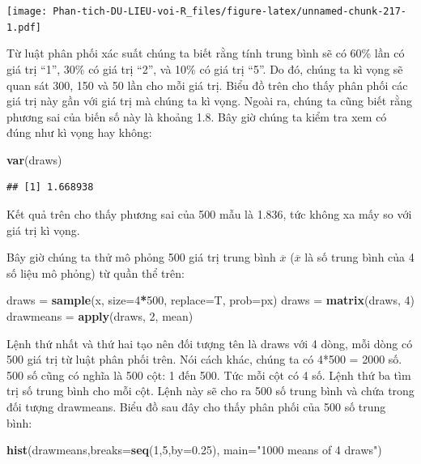 \documentclass[
]{book}
\newenvironment{Shaded}{\begin{snugshade}}{\end{snugshade}}
\newcommand{\DataTypeTok}[1]{\textcolor[rgb]{0.13,0.29,0.53}{#1}}
\newcommand{\DecValTok}[1]{\textcolor[rgb]{0.00,0.00,0.81}{#1}}
\newcommand{\FloatTok}[1]{\textcolor[rgb]{0.00,0.00,0.81}{#1}}
\newcommand{\KeywordTok}[1]{\textcolor[rgb]{0.13,0.29,0.53}{\textbf{#1}}}
\newcommand{\NormalTok}[1]{#1}
\newcommand{\OperatorTok}[1]{\textcolor[rgb]{0.81,0.36,0.00}{\textbf{#1}}}
\newcommand{\StringTok}[1]{\textcolor[rgb]{0.31,0.60,0.02}{#1}}
\begin{document}
\texttt{[image: Phan-tich-DU-LIEU-voi-R\_files/figure-latex/unnamed-chunk-217-1.pdf]}

Từ luật phân phối xác suất chúng ta biết rằng tính trung bình sẽ có 60\% lần có giá trị ``1'', 30\% có giá trị ``2'', và 10\% có giá trị ``5''. Do đó, chúng ta kì vọng sẽ quan sát 300, 150 và 50 lần cho mỗi giá trị. Biểu đồ trên cho thấy phân phối các giá trị này gần với giá trị mà chúng ta kì vọng. Ngoài ra, chúng ta cũng biết rằng phương sai của biến số này là khoảng 1.8. Bây giờ chúng ta kiểm tra xem có đúng như kì vọng hay không:

\begin{Shaded}
\begin{Highlighting}[]
\KeywordTok{var}\NormalTok{(draws)}
\end{Highlighting}
\end{Shaded}

\begin{verbatim}
## [1] 1.668938
\end{verbatim}

Kết quả trên cho thấy phương sai của 500 mẫu là 1.836, tức không xa mấy so với giá trị kì vọng.

Bây giờ chúng ta thử mô phỏng 500 giá trị trung bình \(\overline{x}\) (\(\overline{x}\) là số trung bình của 4 số liệu mô phỏng) từ quần thể trên:

\begin{Shaded}
\begin{Highlighting}[]
\NormalTok{draws =}\StringTok{ }\KeywordTok{sample}\NormalTok{(x, }\DataTypeTok{size=}\DecValTok{4}\OperatorTok{*}\DecValTok{500}\NormalTok{, }\DataTypeTok{replace=}\NormalTok{T, }\DataTypeTok{prob=}\NormalTok{px)}
\NormalTok{draws =}\StringTok{ }\KeywordTok{matrix}\NormalTok{(draws, }\DecValTok{4}\NormalTok{)}
\NormalTok{drawmeans =}\StringTok{ }\KeywordTok{apply}\NormalTok{(draws, }\DecValTok{2}\NormalTok{, mean)}
\end{Highlighting}
\end{Shaded}

Lệnh thứ nhất và thứ hai tạo nên đối tượng tên là draws với 4 dòng, mỗi dòng có 500 giá trị từ luật phân phối trên. Nói cách khác, chúng ta có 4*500 = 2000 số. 500 số cũng có nghĩa là 500 cột: 1 đến 500. Tức mỗi cột có 4 số. Lệnh thứ ba tìm trị số trung bình cho mỗi cột. Lệnh này sẽ cho ra 500 số trung bình và chứa trong đối tượng drawmeans. Biểu đồ sau đây cho thấy phân phối của 500 số trung bình:

\begin{Shaded}
\begin{Highlighting}[]
\KeywordTok{hist}\NormalTok{(drawmeans,}\DataTypeTok{breaks=}\KeywordTok{seq}\NormalTok{(}\DecValTok{1}\NormalTok{,}\DecValTok{5}\NormalTok{,}\DataTypeTok{by=}\FloatTok{0.25}\NormalTok{), }\DataTypeTok{main=}\StringTok{"1000 means of 4 draws"}\NormalTok{)}
\end{Highlighting}
\end{Shaded}
\end{document}

